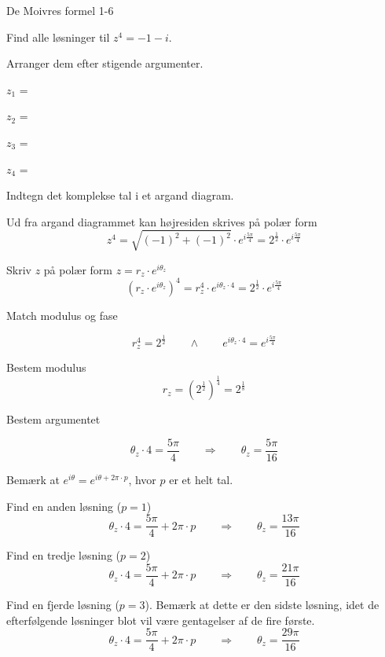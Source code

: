 \documentclass{article}
\begin{document}
\begin{exercise}{De Moivres formel 1-6}

Find alle løsninger til $z^4=-1-i$. 

Arranger dem efter stigende argumenter.

$z_1$ = 		

$z_2$ = 		

$z_3$ = 		

$z_4$ = 


\hint 

Indtegn det komplekse tal i et argand diagram. 

\hint 

Ud fra argand diagrammet kan højresiden skrives på polær form
\[
z^4 = \sqrt{(-1)^2+(-1)^2} \cdot e^{i \frac{5 \pi}{4}} = 2^{\frac{1}{2}} \cdot e^{i \frac{5 \pi}{4}} 
\]


\hint

Skriv $z$ på polær form $z = r_z \cdot e^{i \theta_z}$
\[
\left(r_z \cdot e^{i \theta_z}\right)^4 = r_z^4 \cdot e^{i \theta_z \cdot 4} = 2^{\frac{1}{2}} \cdot e^{i \frac{5 \pi}{4}} 
\]

\hint 
Match modulus og fase

\[
r_z^4 = 2^{\frac{1}{2}} \qquad \wedge \qquad e^{i \theta_z \cdot 4} = e^{i \frac{5 \pi}{4}} 
\]

\hint

Bestem modulus
\[
r_z  =  \left(2^{\frac{1}{2}} \right)^{\frac{1}{4}} = 2^{\frac{1}{8}}
\]

\hint

Bestem argumentet

\[
\theta_z \cdot 4 = \frac{5 \pi}{4} \qquad \Rightarrow \qquad  \theta_z = \frac{5\pi}{16}
\]

\hint

Bemærk at $e^{i \theta} = e^{i \theta + 2 \pi \cdot p}$, hvor $p$ er et helt tal.

\hint

Find en anden løsning ($p=1$)
\[
\theta_z \cdot 4 = \frac{5\pi}{4}  + 2 \pi \cdot p \qquad \Rightarrow \qquad  \theta_z = \frac{13 \pi}{16}
\]

\hint

Find en tredje løsning ($p=2$)
\[
\theta_z \cdot 4 =  \frac{5\pi}{4}  + 2 \pi \cdot p \qquad \Rightarrow  \qquad  \theta_z = \frac{21 \pi}{16}
\]

\hint

Find en fjerde løsning ($p=3$). 
Bemærk at dette er den sidste løsning, idet de efterfølgende 
løsninger blot vil være gentagelser af de fire første. 
\[
\theta_z \cdot 4 = \frac{5\pi}{4} + 2 \pi \cdot p \qquad \Rightarrow  \qquad  \theta_z = \frac{29 \pi}{16}
\]

\end{exercise}
\end{document}
